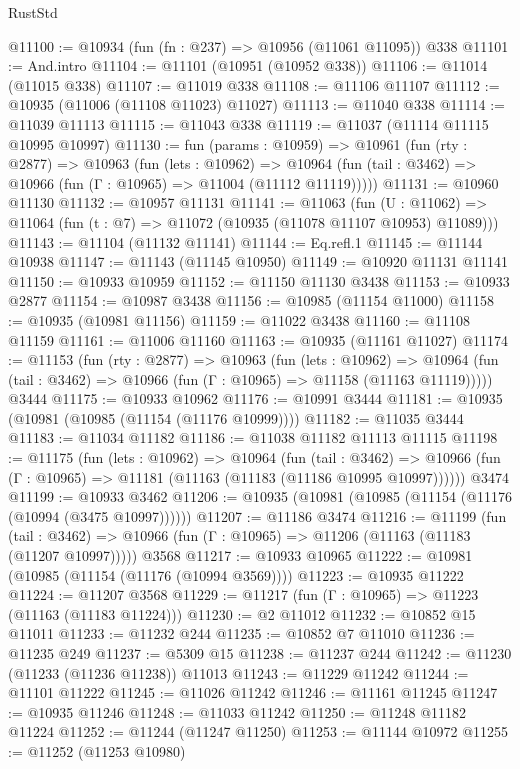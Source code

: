 \begin{lexlean}{RustStd}
\begin{coremodule}
{{{{{{{{{{{{{{{{{{{@11100 := @10934 (fun (fn : @237) => @10956 (@11061 @11095)) @338
@11101 := And.intro
@11104 := @11101 (@10951 (@10952 @338))
@11106 := @11014 (@11015 @338)
@11107 := @11019 @338
@11108 := @11106 @11107
@11112 := @10935 (@11006 (@11108 @11023) @11027)
@11113 := @11040 @338
@11114 := @11039 @11113
@11115 := @11043 @338
@11119 := @11037 (@11114 @11115 @10995 @10997)
@11130 := fun (params : @10959) =>
  @10961
    (fun (rty : @2877) =>
    @10963
      (fun (lets : @10962) =>
      @10964 (fun (tail : @3462) => @10966 (fun (Γ : @10965) => @11004 (@11112 @11119)))))
@11131 := @10960 @11130
@11132 := @10957 @11131
@11141 := @11063
    (fun (U : @11062) => @11064 (fun (t : @7) => @11072 (@10935 (@11078 @11107 @10953) @11089)))
@11143 := @11104 (@11132 @11141)
@11144 := Eq.refl.{1}
@11145 := @11144 @10938
@11147 := @11143 (@11145 @10950)
@11149 := @10920 @11131 @11141
@11150 := @10933 @10959
@11152 := @11150 @11130 @3438
@11153 := @10933 @2877
@11154 := @10987 @3438
@11156 := @10985 (@11154 @11000)
@11158 := @10935 (@10981 @11156)
@11159 := @11022 @3438
@11160 := @11108 @11159
@11161 := @11006 @11160
@11163 := @10935 (@11161 @11027)
@11174 := @11153
    (fun (rty : @2877) =>
    @10963
      (fun (lets : @10962) =>
      @10964 (fun (tail : @3462) => @10966 (fun (Γ : @10965) => @11158 (@11163 @11119)))))
    @3444
@11175 := @10933 @10962
@11176 := @10991 @3444
@11181 := @10935 (@10981 (@10985 (@11154 (@11176 @10999))))
@11182 := @11035 @3444
@11183 := @11034 @11182
@11186 := @11038 @11182 @11113 @11115
@11198 := @11175
    (fun (lets : @10962) =>
    @10964
      (fun (tail : @3462) =>
      @10966 (fun (Γ : @10965) => @11181 (@11163 (@11183 (@11186 @10995 @10997))))))
    @3474
@11199 := @10933 @3462
@11206 := @10935 (@10981 (@10985 (@11154 (@11176 (@10994 (@3475 @10997))))))
@11207 := @11186 @3474
@11216 := @11199
    (fun (tail : @3462) => @10966 (fun (Γ : @10965) => @11206 (@11163 (@11183 (@11207 @10997)))))
    @3568
@11217 := @10933 @10965
@11222 := @10981 (@10985 (@11154 (@11176 (@10994 @3569))))
@11223 := @10935 @11222
@11224 := @11207 @3568
@11229 := @11217 (fun (Γ : @10965) => @11223 (@11163 (@11183 @11224)))
@11230 := @2 @11012
@11232 := @10852 @15 @11011
@11233 := @11232 @244
@11235 := @10852 @7 @11010
@11236 := @11235 @249
@11237 := @5309 @15
@11238 := @11237 @244
@11242 := @11230 (@11233 (@11236 @11238)) @11013
@11243 := @11229 @11242
@11244 := @11101 @11222
@11245 := @11026 @11242
@11246 := @11161 @11245
@11247 := @10935 @11246
@11248 := @11033 @11242
@11250 := @11248 @11182 @11224
@11252 := @11244 (@11247 @11250)
@11253 := @11144 @10972
@11255 := @11252 (@11253 @10980)
}}}}}}}}}}}}}}}}}}}
\end{coremodule}
\end{lexlean}
